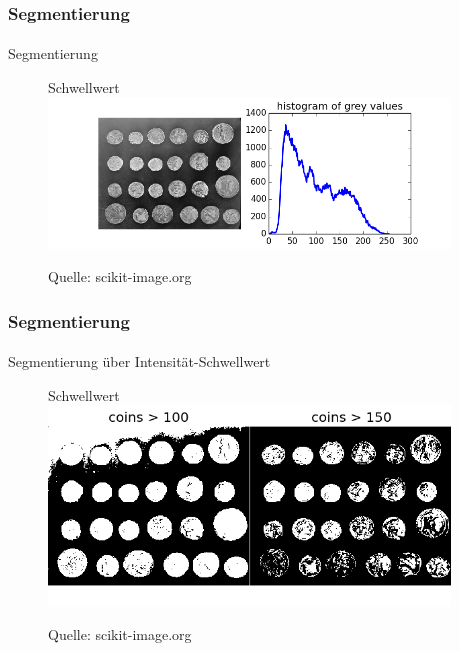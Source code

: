\documentclass{beamer}
\begin{document}
\begin{frame}
    \frametitle{Segmentierung}
\framesubtitle{}
\begin{block}{Segmentierung}

\begin{figure}[htp]
      \centering
Schwellwert \\
    \includegraphics[width=0.95\textwidth]{img/segmentation_edge1} 
      \caption{Quelle: scikit-image.org}
\end{figure}
\end{block}

 \end{frame}




\begin{frame}
    \frametitle{Segmentierung}
\framesubtitle{}
\begin{block}{Segmentierung über Intensität-Schwellwert}

\begin{figure}[htp]
      \centering
Schwellwert \\
    \includegraphics[width=0.95\textwidth]{img/segmentation_thresh1} 
      \caption{Quelle: scikit-image.org}
\end{figure}
\end{block}

 \end{frame}
\end{document}
